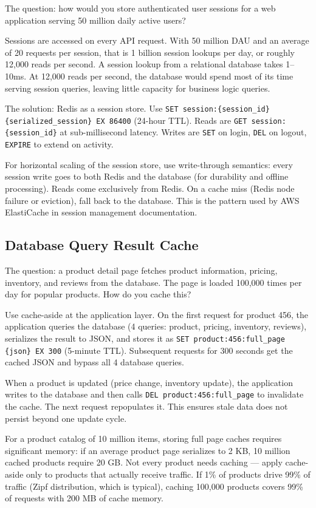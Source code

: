 \documentclass[11pt,a4paper]{article}
\begin{document}
The question: how would you store authenticated user sessions for a web application serving 50 million daily active users?

Sessions are accessed on every API request. With 50 million DAU and an average of 20 requests per session, that is 1 billion session lookups per day, or roughly 12,000 reads per second. A session lookup from a relational database takes 1--10ms. At 12,000 reads per second, the database would spend most of its time serving session queries, leaving little capacity for business logic queries.

The solution: Redis as a session store. Use \texttt{SET session:\{session\_id\} \{serialized\_session\} EX 86400} (24-hour TTL). Reads are \texttt{GET session:\{session\_id\}} at sub-millisecond latency. Writes are \texttt{SET} on login, \texttt{DEL} on logout, \texttt{EXPIRE} to extend on activity.

For horizontal scaling of the session store, use write-through semantics: every session write goes to both Redis and the database (for durability and offline processing). Reads come exclusively from Redis. On a cache miss (Redis node failure or eviction), fall back to the database. This is the pattern used by AWS ElastiCache in session management documentation.

\subsection{Database Query Result Cache}

The question: a product detail page fetches product information, pricing, inventory, and reviews from the database. The page is loaded 100,000 times per day for popular products. How do you cache this?

Use cache-aside at the application layer. On the first request for product 456, the application queries the database (4 queries: product, pricing, inventory, reviews), serializes the result to JSON, and stores it as \texttt{SET product:456:full\_page \{json\} EX 300} (5-minute TTL). Subsequent requests for 300 seconds get the cached JSON and bypass all 4 database queries.

When a product is updated (price change, inventory update), the application writes to the database and then calls \texttt{DEL product:456:full\_page} to invalidate the cache. The next request repopulates it. This ensures stale data does not persist beyond one update cycle.

For a product catalog of 10 million items, storing full page caches requires significant memory: if an average product page serializes to 2 KB, 10 million cached products require 20 GB. Not every product needs caching --- apply cache-aside only to products that actually receive traffic. If 1\% of products drive 99\% of traffic (Zipf distribution, which is typical), caching 100,000 products covers 99\% of requests with 200 MB of cache memory.
\end{document}
